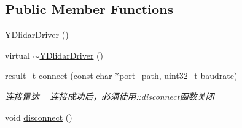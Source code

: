 \subsection*{Public Member Functions}
\begin{DoxyCompactItemize}
\item 
\hyperlink{classydlidar_1_1_y_dlidar_driver_a19e20b6aa35834507a0dacc8a3c510e6}{Y\+Dlidar\+Driver} ()
\item 
virtual \hyperlink{classydlidar_1_1_y_dlidar_driver_a87a50f9f1093a93b4d985f3e8bf27fde}{$\sim$\+Y\+Dlidar\+Driver} ()
\item 
result\+\_\+t \hyperlink{classydlidar_1_1_y_dlidar_driver_a2c5eeecccaa6ed874635de1617e8d7d8}{connect} (const char $\ast$port\+\_\+path, uint32\+\_\+t baudrate)
\begin{DoxyCompactList}\small\item\em 连接雷达 ~\newline
连接成功后，必须使用\+::disconnect函数关闭 \end{DoxyCompactList}\item 
void \hyperlink{classydlidar_1_1_y_dlidar_driver_aa26790ae49d33936229fa67739a8ff5f}{disconnect} ()\hypertarget{classydlidar_1_1_y_dlidar_driver_aa26790ae49d33936229fa67739a8ff5f}{}\label{classydlidar_1_1_y_dlidar_driver_aa26790ae49d33936229fa67739a8ff5f}


\end{DoxyCompactItemize}
